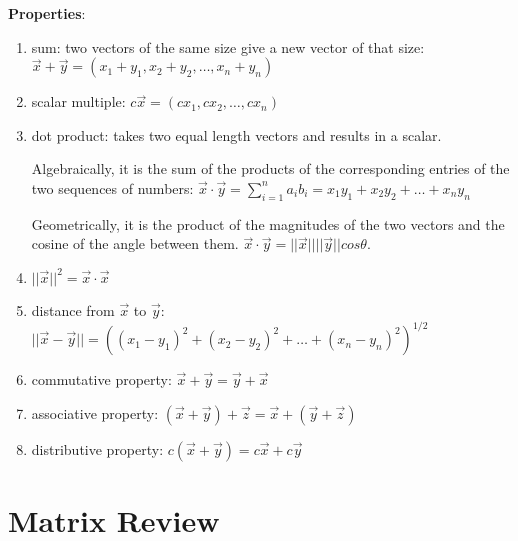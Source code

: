 \documentclass[12pt]{article}
\begin{document}
\textbf{Properties}:
%
\begin{enumerate}
\item sum: two vectors of the same size give a new vector of that size: $\vec{x} + \vec{y} = (x_1 + y_1, x_2 + y_2, \dots, x_n + y_n)$

\item scalar multiple: $c\vec{x} = (cx_1, cx_2, \dots, cx_n)$


\item dot product: takes two equal length vectors and results in a scalar. 

Algebraically, it is the sum of the products of the corresponding entries of the two sequences of numbers: $\vec{x} \cdot \vec{y} = \sum_{i=1}^n a_i b_i = x_1 y_1 + x_2 y_2 + \dots + x_n y_n$

Geometrically, it is the product of the magnitudes of the two vectors and the cosine of the angle between them. $\vec{x} \cdot \vec{y} = ||\vec{x}|| ||\vec{y}|| cos\theta$.

\item $||\vec{x}||^2 = \vec{x} \cdot \vec{x}$

\item distance from $\vec{x}$ to $\vec{y}$: $||\vec{x} - \vec{y}|| = ((x_1 - y_1)^2 + (x_2 - y_2)^2 + \dots + (x_n - y_n)^2)^{1/2}$

\item commutative property: $\vec{x} + \vec{y} = \vec{y} + \vec{x}$

\item associative property: $(\vec{x} + \vec{y}) + \vec{z} = \vec{x} + (\vec{y} + \vec{z})$

\item distributive property: $c(\vec{x} + \vec{y}) = c\vec{x} + c\vec{y}$
\end{enumerate}

\section*{Matrix Review}
\end{document}
